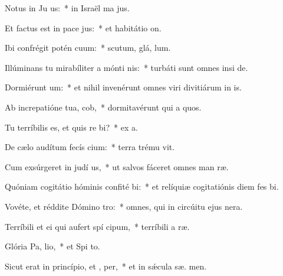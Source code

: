 \item Notus in Ju us:~* in Israël ma  jus.
\item Et factus est in pace  jus:~* et habitátio   on.
\item Ibi confrégit potén cuum:~* scutum, glá,  lum.
\item Illúminans tu mirabíliter a mónti nis:~* turbáti sunt omnes insi de.
\item Dormiérunt  um:~* et nihil invenérunt omnes viri divitiárum in  is.
\item Ab increpatióne tua,  cob,~* dormitavérunt qui a quos.
\item Tu terríbilis es, et quis re bi?~* ex   a.
\item De cælo audítum fecís cium:~* terra trému  vit.
\item Cum exsúrgeret in judí us,~* ut salvos fáceret omnes man ræ.
\item Quóniam cogitátio hóminis confité bi:~* et relíquiæ cogitatiónis diem fes  bi.
\item Vovéte, et réddite Dómino  tro:~* omnes, qui in circúitu ejus  nera.
\item Terríbili et ei qui aufert spí cipum,~* terríbili a  ræ.
\item Glória Pa,  lio,~* et Spi to.
\item Sicut erat in princípio, et ,  per,~* et in sǽcula sæ. men.
